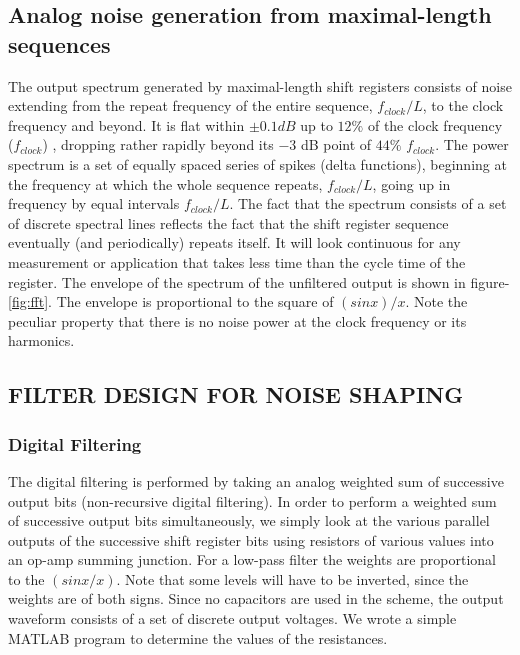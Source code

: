 \documentclass[a4paper,12pt]{article}
\begin{document}
\subsection{Analog noise generation from maximal-length sequences}
The output spectrum generated by maximal-length shift registers consists of noise extending from the repeat frequency of the entire sequence, $f_{clock}/L$, to the clock frequency and beyond. It is flat within $\pm0.1dB$ up to $12\%$ of the clock frequency ($f_{clock}$) , dropping rather rapidly beyond its $-3$ dB point of $44\%$ $f_{clock}$. The power spectrum is a set of equally spaced series of spikes (delta functions), beginning at the frequency at which the whole sequence repeats, $f_{clock}/L$, going up in frequency by equal intervals $f_{clock}/L$.\cite{aoe} The fact that the spectrum consists of a set of discrete spectral lines reflects the fact that the shift register sequence eventually (and periodically) repeats itself. It will look continuous for any measurement or application that takes less time than the cycle time of the register. The envelope of the spectrum of the unfiltered output is shown in figure-\ref{fig:fft}. The envelope is proportional to the square of $(sin x)/x$. Note the peculiar property that there is no noise power at the clock frequency or its harmonics.

\subsection{FILTER DESIGN FOR NOISE SHAPING}
\subsubsection{Digital Filtering}
   The digital filtering is performed by taking an analog weighted sum of successive output bits (non-recursive digital filtering). In order to perform a weighted sum of successive output bits simultaneously, we simply look at the various parallel outputs of the successive shift register bits using resistors of various values into an op-amp summing junction. For a low-pass filter the weights are proportional to the $(sin x / x)$. Note that some levels will have to be inverted, since the weights are of both signs. Since no capacitors are used in the scheme, the output waveform consists of a set of discrete output voltages. We wrote a simple MATLAB program to determine the values of the resistances.\\
   
\end{document}
